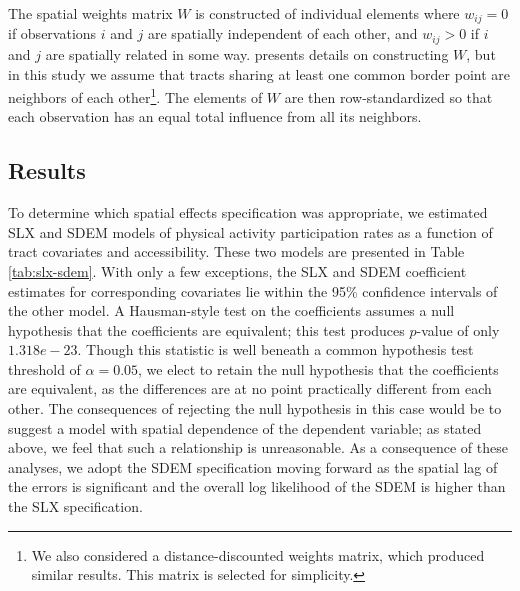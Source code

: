 \documentclass[Crown,sageh.bst]{sagej}
\begin{document}
The spatial weights matrix \(W\) is constructed of individual elements
where \(w_{ij} = 0\) if observations \(i\) and \(j\) are spatially
independent of each other, and \(w_{ij} > 0\) if \(i\) and \(j\) are
spatially related in some way. \citet{Dubin1998} presents details on
constructing \(W\), but in this study we assume that tracts sharing at
least one common border point are neighbors of each other\footnote{We
  also considered a distance-discounted weights matrix, which produced
  similar results. This matrix is selected for simplicity.}. The
elements of \(W\) are then row-standardized so that each observation has
an equal total influence from all its neighbors.

\hypertarget{results}{%
\subsection{Results}\label{results}}

To determine which spatial effects specification was appropriate, we
estimated SLX and SDEM models of physical activity participation rates
as a function of tract covariates and accessibility. These two models
are presented in Table \ref{tab:slx-sdem}. With only a few exceptions,
the SLX and SDEM coefficient estimates for corresponding covariates lie
within the 95\% confidence intervals of the other model. A Hausman-style
test \citep{Pace2008} on the coefficients assumes a null hypothesis that
the coefficients are equivalent; this test produces \(p\)-value of only
\(1.318e-23\). Though this statistic is well beneath a common hypothesis
test threshold of \(\alpha = 0.05\), we elect to retain the null
hypothesis that the coefficients are equivalent, as the differences are
at no point practically different from each other. The consequences of
rejecting the null hypothesis in this case would be to suggest a model
with spatial dependence of the dependent variable; as stated above, we
feel that such a relationship is unreasonable. As a consequence of these
analyses, we adopt the SDEM specification moving forward as the spatial
lag of the errors is significant and the overall log likelihood of the
SDEM is higher than the SLX specification.
\end{document}
